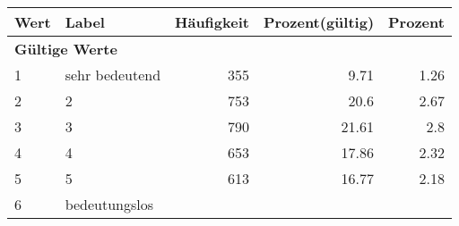      \begin{longtable}{lXrrr}
     \toprule
     \textbf{Wert} & \textbf{Label} & \textbf{Häufigkeit} & \textbf{Prozent(gültig)} & \textbf{Prozent} \\
     \endhead
     \midrule
     \multicolumn{5}{l}{\textbf{Gültige Werte}}\\

     1 &
     \multicolumn{1}{X}{ sehr bedeutend   } &


       \num{355} &
       \num[round-mode=places,round-precision=2]{9.71} &
         \num[round-mode=places,round-precision=2]{1.26} \\

     2 &
     \multicolumn{1}{X}{ 2   } &


       \num{753} &
       \num[round-mode=places,round-precision=2]{20.6} &
         \num[round-mode=places,round-precision=2]{2.67} \\

     3 &
     \multicolumn{1}{X}{ 3   } &


       \num{790} &
       \num[round-mode=places,round-precision=2]{21.61} &
         \num[round-mode=places,round-precision=2]{2.8} \\

     4 &
     \multicolumn{1}{X}{ 4   } &


       \num{653} &
       \num[round-mode=places,round-precision=2]{17.86} &
         \num[round-mode=places,round-precision=2]{2.32} \\

     5 &
     \multicolumn{1}{X}{ 5   } &


       \num{613} &
       \num[round-mode=places,round-precision=2]{16.77} &
         \num[round-mode=places,round-precision=2]{2.18} \\

     6 &
     \multicolumn{1}{X}{ bedeutungslos   } &



\end{longtable}

